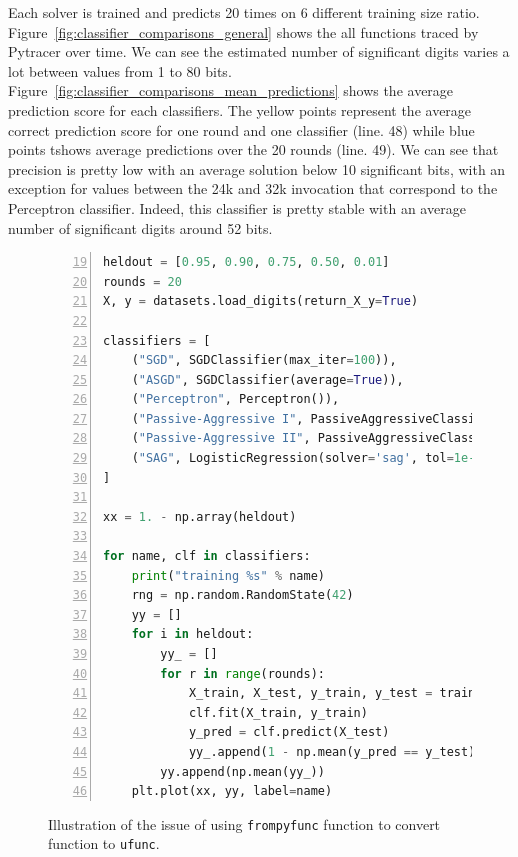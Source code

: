 \documentclass[11pt]{article}
\begin{document}
Each solver is trained and predicts 20 times on 6 different training size ratio.
Figure~\ref{fig:classifier_comparisons_general} shows the all functions
traced by Pytracer over time. We can see the estimated number of significant digits varies a lot between 
values from 1 to 80 bits. Figure~\ref{fig:classifier_comparisons_mean_predictions} shows 
the average prediction score for each classifiers. The yellow points 
represent the average correct prediction score for one round and one classifier (line. 48) while blue points
tshows average predictions over the 20 rounds (line. 49).
We can see that precision is pretty low with an average solution below 10 significant bits, with 
an exception for values between the 24k and 32k invocation that correspond to the Perceptron
classifier. Indeed, this classifier is pretty stable with an average number of significant digits around 52 bits.

\begin{figure}
    \begin{lstlisting}[language=Python,style=customPython,numbers=left, firstnumber=19]
heldout = [0.95, 0.90, 0.75, 0.50, 0.01]
rounds = 20
X, y = datasets.load_digits(return_X_y=True)

classifiers = [
    ("SGD", SGDClassifier(max_iter=100)),
    ("ASGD", SGDClassifier(average=True)),
    ("Perceptron", Perceptron()),
    ("Passive-Aggressive I", PassiveAggressiveClassifier(loss='hinge',C=1.0, tol=1e-4)),
    ("Passive-Aggressive II", PassiveAggressiveClassifier(loss='squared_hinge',C=1.0, tol=1e-4)),
    ("SAG", LogisticRegression(solver='sag', tol=1e-1, C=1.e4 / X.shape[0]))
]

xx = 1. - np.array(heldout)

for name, clf in classifiers:
    print("training %s" % name)
    rng = np.random.RandomState(42)
    yy = []
    for i in heldout:
        yy_ = []
        for r in range(rounds):
            X_train, X_test, y_train, y_test = train_test_split(X, y, test_size=i, random_state=rng)
            clf.fit(X_train, y_train)
            y_pred = clf.predict(X_test)
            yy_.append(1 - np.mean(y_pred == y_test))
        yy.append(np.mean(yy_))
    plt.plot(xx, yy, label=name)
    \end{lstlisting}
    \label{fig:wrapper_code}
\caption{Illustration of the issue of using \texttt{frompyfunc} function to convert function to \texttt{ufunc}.}
\end{figure}
\end{document}
